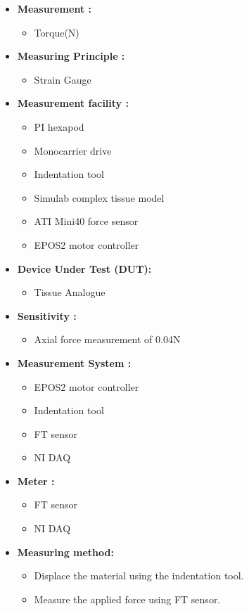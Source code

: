 \documentclass[10pt,a4paper]{article}
\begin{document}
\begin{enumerate}[label=\Roman*]
\begin{itemize}
	\item
	\textbf{Measurement :}
	\begin{itemize}
		\item
		Torque(N)
	\end{itemize}
	\item
	\textbf{Measuring Principle :}
	\begin{itemize}
		\item
		Strain Gauge
	\end{itemize} 
	\item
	\textbf{Measurement facility :}
	\begin{itemize}
		\item
		PI hexapod
		\item
		Monocarrier drive
		\item
		Indentation tool
		\item
		Simulab complex tissue model
		\item
		ATI Mini40 force sensor
		\item
		EPOS2 motor controller
	\end{itemize} 
	\item
	\textbf{Device Under Test (DUT):}
	\begin{itemize}
		\item
		Tissue Analogue
	\end{itemize} 
	\item
	\textbf{Sensitivity :}
	\begin{itemize}
	\item
	Axial force measurement of 0.04N
	\end{itemize} 
	\item
	\textbf{Measurement System :}
	\begin{itemize}
		\item
		EPOS2 motor controller
		\item
		Indentation tool
		\item
		FT sensor
		\item
		NI DAQ
	\end{itemize}
	\item
	\textbf{Meter :}
	\begin{itemize}
		\item
		FT sensor
		\item
		NI DAQ
	\end{itemize}
	\item
	\textbf{Measuring method: }
	\begin{itemize}
		\item
		Displace the material using the indentation tool.
		\item
		Measure the applied force using FT sensor.
	\end{itemize}

	
	
\end{itemize}


\end{enumerate}	
\end{document}

